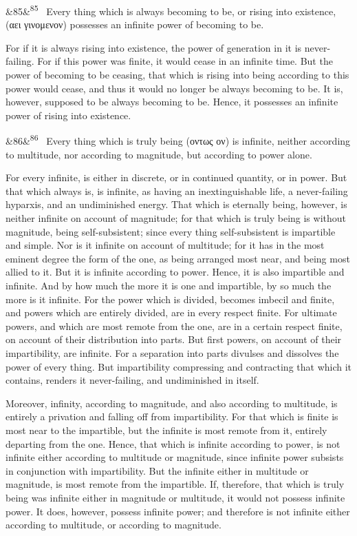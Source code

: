\documentclass[12pt]{article}
\newcommand{\para}[1][]{\par\noindent\ifx&#1&\else\textsuperscript{\footnotesize #1}~\fi}
\begin{document}
\para[85] Every thing which is always becoming to be, or rising into existence, (αει γινομενον) possesses an infinite power of becoming to be.

For if it is always rising into existence, the power of generation in it is never-failing. For if this power was finite, it would cease in an infinite time. But the power of becoming to be ceasing, that which is rising into being according to this power would cease, and thus it would no longer be always becoming to be. It is, however, supposed to be always becoming to be. Hence, it possesses an infinite power of rising into existence.

\para[86] Every thing which is truly being (οντως ον) is infinite, neither according to multitude, nor according to magnitude, but according to power alone.

For every infinite, is either in discrete, or in continued quantity, or in power. But that which always is, is infinite, as having an inextinguishable life, a never-failing hyparxis, and an undiminished energy. That which is eternally being, however, is neither infinite on account of magnitude; for that which is truly being is without magnitude, being self-subsistent; since every thing self-subsistent is impartible and simple. Nor is it infinite on account of multitude; for it has in the most eminent degree the form of the one, as being arranged most near, and being most allied to it. But it is infinite according to power. Hence, it is also impartible and infinite. And by how much the more it is one and impartible, by so much the more is it infinite. For the power which is divided, becomes imbecil and finite, and powers which are entirely divided, are in every respect finite. For ultimate powers, and which are most remote from the one, are in a certain respect finite, on account of their distribution into parts. But first powers, on account of their impartibility, are infinite. For a separation into parts divulses and dissolves the power of every thing. But impartibility compressing and contracting that which it contains, renders it never-failing, and undiminished in itself.

Moreover, infinity, according to magnitude, and also according to multitude, is entirely a privation and falling off from impartibility. For that which is finite is most near to the impartible, but the infinite is most remote from it, entirely departing from the one. Hence, that which is infinite according to power, is not infinite either according to multitude or magnitude, since infinite power subsists in conjunction with impartibility. But the infinite either in multitude or magnitude, is most remote from the impartible. If, therefore, that which is truly being was infinite either in magnitude or multitude, it would not possess infinite power. It does, however, possess infinite power; and therefore is not infinite either according to multitude, or according to magnitude.
\end{document}
